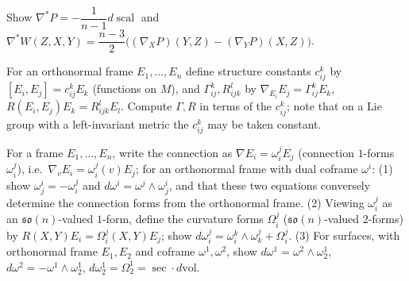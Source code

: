 \begin{remark}
  \label{rem:pet-ch3-ex-26}


  Show $\nabla^*P=-\dfrac1{n-1}d\operatorname{scal}$ and
  $\nabla^*W(Z,X,Y)=\dfrac{n-3}2\big((\nabla_XP)(Y,Z)-(\nabla_YP)(X,Z)\big)$.
\end{remark}

\begin{remark}
  \label{rem:pet-ch3-ex-27}


  For an orthonormal frame $E_1,\dots,E_n$ define structure constants $c^k_{ij}$
  by $[E_i,E_j]=c^k_{ij}E_k$ (functions on $M$), and $\Gamma^k_{ij},R^l_{ijk}$ by
  $\nabla_{E_i}E_j=\Gamma^k_{ij}E_k$, $R(E_i,E_j)E_k=R^l_{ijk}E_l$. Compute
  $\Gamma,R$ in terms of the $c^k_{ij}$; note that on a Lie group with a
  left-invariant metric the $c^k_{ij}$ may be taken constant.
\end{remark}

\begin{remark}
  \label{rem:pet-ch3-ex-28}


  For a frame $E_1,\dots,E_n$, write the connection as $\nabla E_i=\omega^j_iE_j$
  (connection $1$-forms $\omega^j_i$), i.e.\ $\nabla_vE_i=\omega^j_i(v)E_j$; for
  an orthonormal frame with dual coframe $\omega^i$: (1) show $\omega^i_j=-\omega^j_i$
  and $d\omega^i=\omega^j\wedge\omega^i_j$, and that these two equations
  conversely determine the connection forms from the orthonormal frame. (2)
  Viewing $\omega^j_i$ as an $\mathfrak{so}(n)$-valued $1$-form, define the
  curvature forms $\Omega^j_i$ ($\mathfrak{so}(n)$-valued $2$-forms) by
  $R(X,Y)E_i=\Omega^j_i(X,Y)E_j$; show
  $d\omega^j_i=\omega^k_i\wedge\omega^j_k+\Omega^j_i$. (3) For surfaces, with
  orthonormal frame $E_1,E_2$ and coframe $\omega^1,\omega^2$, show
  $d\omega^1=\omega^2\wedge\omega^1_2$, $d\omega^2=-\omega^1\wedge\omega^1_2$,
  $d\omega^1_2=\Omega^1_2=\sec\cdot d\mathrm{vol}$.
\end{remark}

